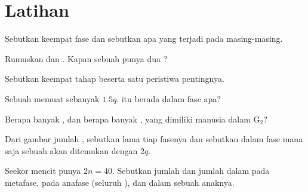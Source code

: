 \section{Latihan}

\begin{exercise}[$\star$]\label{exo:g11:cell-cycle-mitosis:1}
Sebutkan keempat fase  dan sebutkan apa yang terjadi pada masing-masing.
\end{exercise}

\begin{exercise}[$\star$]\label{exo:g11:cell-cycle-mitosis:2}
Rumuskan  dan . Kapan sebuah  punya dua
?
\end{exercise}

\begin{exercise}[$\star$]\label{exo:g11:cell-cycle-mitosis:3}
Sebutkan keempat tahap  beserta satu peristiwa pentingnya.
\end{exercise}

\begin{exercise}[$\star$]\label{exo:g11:cell-cycle-mitosis:4}
Sebuah  memuat  sebanyak $1.5q$.  itu berada dalam fase apa?
\end{exercise}

\begin{exercise}[$\star$]\label{exo:g11:cell-cycle-mitosis:5}
Berapa banyak , dan berapa banyak , yang dimiliki 
manusia dalam $\mathrm{G_2}$?
\end{exercise}

\begin{exercise}[$\star\star$]\label{exo:g11:cell-cycle-mitosis:6}
Dari gambar jumlah , sebutkan lama tiap fasenya dan sebutkan
dalam fase mana saja sebuah  akan ditemukan dengan $2q$.
\end{exercise}

\begin{exercise}[$\star\star$]\label{exo:g11:cell-cycle-mitosis:7}
Seekor mencit punya $2n = 40$. Sebutkan jumlah  dan jumlah
 dalam  pada metafase, pada anafase (seluruh ), dan
dalam sebuah  anaknya.
\end{exercise}

